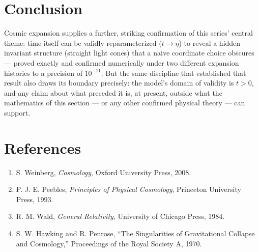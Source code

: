 \documentclass[10pt,journal,compsoc]{IEEEtran}
\begin{document}
\section{Conclusion}
Cosmic expansion supplies a further, striking confirmation of this series' central theme: time itself can be validly reparameterized ($t\to\eta$) to reveal a hidden invariant structure (straight light cones) that a naive coordinate choice obscures — proved exactly and confirmed numerically under two different expansion histories to a precision of $10^{-11}$. But the same discipline that established that result also draws its boundary precisely: the model's domain of validity is $t>0$, and any claim about what preceded it is, at present, outside what the mathematics of this section — or any other confirmed physical theory — can support.

\section*{References}
\begin{small}
\begin{enumerate}
    \item S. Weinberg, \textit{Cosmology}, Oxford University Press, 2008.
    \item P. J. E. Peebles, \textit{Principles of Physical Cosmology}, Princeton University Press, 1993.
    \item R. M. Wald, \textit{General Relativity}, University of Chicago Press, 1984.
    \item S. W. Hawking and R. Penrose, ``The Singularities of Gravitational Collapse and Cosmology,'' Proceedings of the Royal Society A, 1970.
\end{enumerate}
\end{small}
\end{document}
